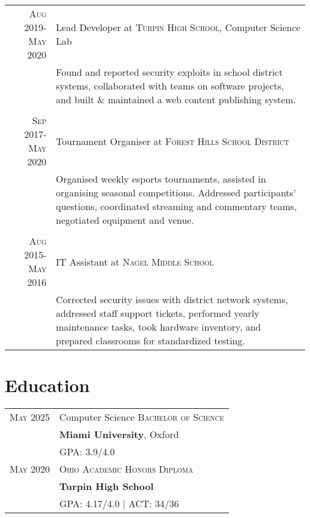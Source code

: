 \documentclass[a4paper,10pt]{article} %
\begin{document}
\begin{tabular}{r|p{11cm}}
\textsc{Aug 2019-May 2020} & Lead Developer at \textsc{Turpin High School}, Computer Science Lab \emph{}\\
& \footnotesize{Found and reported security exploits in school district systems, collaborated with teams on software projects, and built \& maintained a web content publishing system.}\\
\multicolumn{2}{c}{} \\


\textsc{Sep 2017-May 2020} & Tournament Organiser at \textsc{Forest Hills School District} \emph{}\\
& \footnotesize{Organised weekly esports tournaments, assisted in organising seasonal competitions. Addressed participants' questions, coordinated streaming and commentary teams, negotiated equipment and venue.}\\
\multicolumn{2}{c}{} \\


\textsc{Aug 2015-May 2016} & IT Assistant at \textsc{Nagel Middle School} \emph{}\\
& \footnotesize{Corrected security issues with district network systems, addressed staff support tickets, performed yearly maintenance tasks, took hardware inventory, and prepared classrooms for standardized testing. }
\end{tabular}


\section{Education}

\begin{tabular}{rl}	
\textsc{May 2025} & Computer Science \textsc{Bachelor of Science}\\ &
\textbf{Miami University}, Oxford\\
&\normalsize \textsc{GPA}: 3.9/4.0 \\


\textsc{May 2020} & \textsc{Ohio Academic Honors Diploma}\\ &
\textbf{Turpin High School}\\
&\normalsize \textsc{GPA}: 4.17/4.0 {\hfill| \footnotesize \textsc{ACT}: 34/36}\\
\end{tabular}
\end{document}
